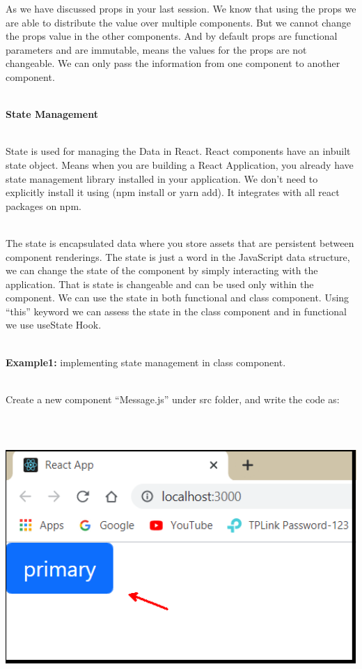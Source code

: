 \documentclass{article}
\begin{document}
\noindent 
As we have discussed props in your last session. We know that using the props we are able to distribute the value over multiple components. But we cannot change the props value in the other components. And by default props are functional parameters and are immutable, means the values for the props are not changeable. We can only pass the information from one component to another component.

\noindent 

\noindent \\
\textbf{State Management  }

\noindent \\
State is used for managing the Data in React. React components have an inbuilt state object. Means when you are building a React Application, you already have state management library installed in your application. We don't need to explicitly install it using (npm install or yarn add). It integrates with all react packages on npm.

\noindent 

\noindent \\
The state is encapsulated data where you store assets that are persistent between component renderings. The state is just a word in the JavaScript data structure, we can change the state of the component by simply interacting with the application. That is state is changeable and can be used only within the component. We can use the state in both functional and class component. Using ``this'' keyword we can assess the state in the class component and in functional we use useState Hook.

\noindent 

\noindent \\
\textbf{Example1: }implementing state management in class component.

\noindent \\
Create a new component ``Message.js'' under src folder, and write the code as:

\begin{center}
	\noindent \includegraphics*[width=5.43in, height=4.19in]{IMG-09-27}
\end{center}
\end{document}
